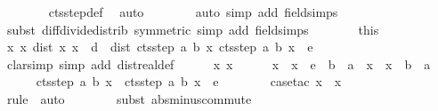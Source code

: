 \documentclass{article}
\theoremstyle{definition}
\begin{document}
\begin{isabellebody}
\ \ \ \ \ \ \isamarkupfalse%
\ cts{\isacharunderscore}step{\isacharunderscore}def\ \isamarkupfalse%
\ auto\isanewline
\ \ \ \ \ \ \isamarkupfalse%
\ {\isacharparenleft}auto\ simp\ add{\isacharcolon}\ field{\isacharunderscore}simps{\isacharparenright}{\isacharbrackleft}{}{\isacharbrackright}\isanewline
\ \ \ \ \ \ \isamarkupfalse%
\ {\isacharparenleft}subst\ diff{\isacharunderscore}divide{\isacharunderscore}distrib\ {\isacharbrackleft}symmetric{\isacharbrackright}{\isacharcomma}\ simp\ add{\isacharcolon}\ field{\isacharunderscore}simps{\isacharparenright}\isanewline
\ \ \isacommand{{\isacharbraceright}}\isamarkupfalse%
\ \isamarkupfalse%
\ {\isacharasterisk}\ {\isacharequal}\ this\isanewline
\ \ \isamarkupfalse%
\ {\isachardoublequoteopen}{\isasymforall}x\ x{\isacharprime}{\isachardot}\ dist\ x{\isacharprime}\ x\ {\isacharless}\ {\isacharquery}d\ {\isasymlongrightarrow}\ dist\ {\isacharparenleft}cts{\isacharunderscore}step\ a\ b\ x{\isacharprime}{\isacharparenright}\ {\isacharparenleft}cts{\isacharunderscore}step\ a\ b\ x{\isacharparenright}\ {\isacharless}\ e{\isachardoublequoteclose}\isanewline
\ \ \isamarkupfalse%
\ {\isacharparenleft}clarsimp\ simp\ add{\isacharcolon}\ dist{\isacharunderscore}real{\isacharunderscore}def{\isacharparenright}\isanewline
\ \ \ \ \isamarkupfalse%
\ x\ x{\isacharprime}\isanewline
\ \ \ \ \isamarkupfalse%
\ {\isachardoublequoteopen}{\isasymbar}x{\isacharprime}\ {\isacharminus}\ x{\isasymbar}\ {\isacharless}\ e\ {\isacharasterisk}\ {\isacharparenleft}b\ {\isacharminus}\ a{\isacharparenright}{\isachardoublequoteclose}\ \ {\isachardoublequoteopen}{\isasymbar}x{\isacharprime}\ {\isacharminus}\ x{\isasymbar}\ {\isacharless}\ b\ {\isacharminus}\ a{\isachardoublequoteclose}\ \isanewline
\ \ \ \ \isamarkupfalse%
\ {\isachardoublequoteopen}{\isasymbar}cts{\isacharunderscore}step\ a\ b\ x{\isacharprime}\ {\isacharminus}\ cts{\isacharunderscore}step\ a\ b\ x{\isasymbar}\ {\isacharless}\ e{\isachardoublequoteclose}\isanewline
\ \ \ \ \ \ \isamarkupfalse%
\ {\isacharparenleft}case{\isacharunderscore}tac\ {\isachardoublequoteopen}x\ {\isasymle}\ x{\isacharprime}{\isachardoublequoteclose}{\isacharparenright}\isanewline
\ \ \ \ \ \ \isamarkupfalse%
\ {\isacharparenleft}rule\ {\isacharasterisk}{\isacharcomma}\ auto{\isacharparenright}\isanewline
\ \ \ \ \ \ \isamarkupfalse%
\ {\isacharparenleft}subst\ abs{\isacharunderscore}minus{\isacharunderscore}commute{\isacharparenright}\isanewline

\end{isabellebody}
\end{document}
